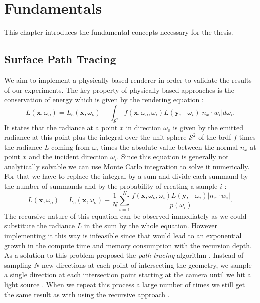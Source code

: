 \chapter{Fundamentals}
This chapter introduces the fundamental concepts necessary for the thesis.
\section{Surface Path Tracing}
We aim to implement a physically based renderer in order to validate the results of our experiments.
The key property of physically based approaches is the conservation of energy which is given by the rendering equation \cite{rendering_equation}:
\begin{equation}
    \label{eq:render_equation}
    L(\boldsymbol{x}, \omega_o) = L_e(\boldsymbol{x}, \omega_o) + \int_{\mathcal{S}^2} f(\boldsymbol{x}, \omega_o, \omega_i) L(\boldsymbol{y}, -\omega_i) |n_x \cdot w_i| d\omega_i.
\end{equation}
It states that the radiance at a point $x$ in direction $\omega_o$ is given by the emitted radiance at this point plus the integral over the unit sphere $\mathcal{S}^2$ of the \ac{brdf} $f$ times the radiance $L$ coming from $\omega_i$ times the absolute value between the normal $n_x$ at point $x$ and the incident direction $\omega_i$.
Since this equation is generally not analytically solvable we can use Monte Carlo integration to solve it numerically.
For that we have to replace the integral by a sum and divide each summand by the number of summands and by the probability of creating a sample $i$ \cite{pbr}:
\begin{equation*}
    L(\boldsymbol{x}, \omega_o) = L_e(\boldsymbol{x}, \omega_o) + \frac{1}{N}\sum_{i=1}^{N} \frac{f(\boldsymbol{x}, \omega_o, \omega_i) L(\boldsymbol{y}, -\omega_i) |n_x \cdot w_i|}{p(\omega_i)}.
\end{equation*}
The recursive nature of this equation can be observed immediately as we could substitute the radiance $L$ in the sum by the whole equation.
However implementing it this way is infeasible since that would lead to an exponential growth in the compute time and memory consumption with the recursion depth.
As a solution to this problem \citeauthor{rendering_equation} proposed the \textit{path tracing} algorithm \cite{rendering_equation}.
Instead of sampling $N$ new directions at each point of intersecting the geometry, we sample a single direction at each intersection point starting at the camera until we hit a light source \cite{rendering_equation}.
When we repeat this process a large number of times we still get the same result as with using the recursive approach \cite{pbr}.

